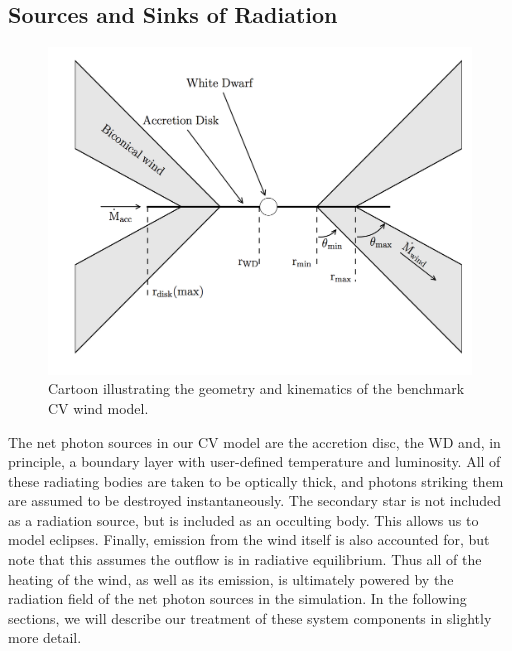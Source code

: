 

\subsection{Sources and Sinks of Radiation}
\label{radsources}

\begin{figure} 
\centering
\includegraphics[width=1.0\textwidth]{figures/05-cvpaper/fig2_cartoon.png}
\caption{Cartoon illustrating the geometry and kinematics of the benchmark CV wind model.}
\label{cartoon}
\end{figure} 

The net photon sources in our CV model are the accretion disc, the
WD and, in principle, a boundary layer with user-defined temperature
and luminosity. All of these radiating bodies are taken to be
optically thick, and photons striking them are assumed to be destroyed
instantaneously. The secondary star is not included as a radiation
source, but is included as an occulting body. This allows us to model
eclipses. Finally, emission from the wind itself is also accounted for, but
note that this assumes the outflow is in radiative equilibrium. Thus all
of the heating of the wind, as well as its emission, is ultimately
powered by the radiation field of the net photon sources in the
simulation. In the following sections, we will describe our treatment
of these system components in slightly more detail.


